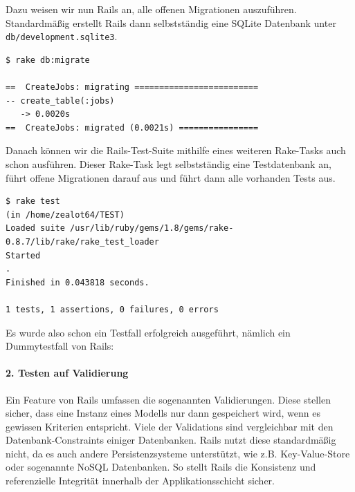 
Dazu weisen wir nun Rails an, alle offenen Migrationen auszuführen. Standardmäßig erstellt Rails dann selbstständig eine SQLite Datenbank unter \texttt{db/development.sqlite3}.


\begin{lstlisting}[caption=Shell]
$ rake db:migrate

==  CreateJobs: migrating =========================
-- create_table(:jobs)
   -> 0.0020s
==  CreateJobs: migrated (0.0021s) ================
\end{lstlisting}

Danach können wir die Rails-Test-Suite mithilfe eines weiteren Rake-Tasks auch schon ausführen. Dieser Rake-Task legt selbstständig eine Testdatenbank an, führt offene Migrationen darauf aus und führt dann alle vorhanden Tests aus.

\begin{lstlisting}[caption=Shell]
$ rake test
(in /home/zealot64/TEST)
Loaded suite /usr/lib/ruby/gems/1.8/gems/rake-0.8.7/lib/rake/rake_test_loader
Started
.
Finished in 0.043818 seconds.

1 tests, 1 assertions, 0 failures, 0 errors
\end{lstlisting}

Es wurde also schon ein Testfall erfolgreich ausgeführt, nämlich ein Dummytestfall von Rails:

\begin{ruby}[label={test/units/job\_test.rb}]
 

   
    
     
\end{ruby}
\label{list:bla}


\paragraph{2. Testen auf Validierung}

Ein Feature von Rails umfassen die sogenannten Validierungen. Diese stellen sicher, dass eine Instanz eines Modells nur dann gespeichert wird, wenn es gewissen Kriterien entspricht. Viele der Validations sind vergleichbar mit den Datenbank-Constraints einiger Datenbanken. Rails nutzt diese standardmäßig nicht, da es auch andere Persistenzsysteme unterstützt, wie z.B. Key-Value-Store oder sogenannte NoSQL Datenbanken. So stellt Rails die Konsistenz und referenzielle Integrität innerhalb der Applikationsschicht sicher.

